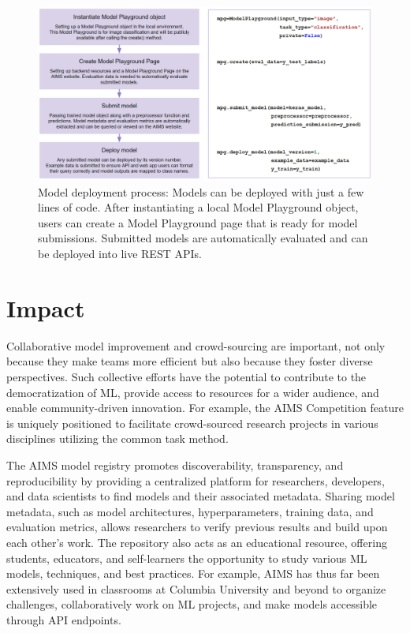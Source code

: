 \begin{figure}
  \centering
  \includegraphics[width=1\textwidth]{figures/fig_aims_code_new.png}
  \caption{Model deployment process: Models can be deployed with just a few lines of code. After instantiating a local Model Playground object, users can create a Model Playground page that is ready for model submissions. Submitted models are automatically evaluated and can be deployed into live REST APIs.}
  \label{fig:fig_code_example}
\end{figure}

\section{Impact}
Collaborative model improvement and crowd-sourcing are important, not only because they make teams more efficient but also because they foster diverse perspectives. Such collective efforts have the potential to contribute to the democratization of ML, provide access to resources for a wider audience, and enable community-driven innovation. For example, the AIMS Competition feature is uniquely positioned to facilitate crowd-sourced research projects in various disciplines utilizing the common task method.

The AIMS model registry promotes discoverability, transparency, and reproducibility by providing a centralized platform for researchers, developers, and data scientists to find models and their associated metadata. Sharing model metadata, such as model architectures, hyperparameters, training data, and evaluation metrics, allows researchers to verify previous results and build upon each other's work. The repository also acts as an educational resource, offering students, educators, and self-learners the opportunity to study various ML models, techniques, and best practices. For example, AIMS has thus far been extensively used in classrooms at Columbia University and beyond to organize challenges, collaboratively work on ML projects, and make models accessible through API endpoints. 

